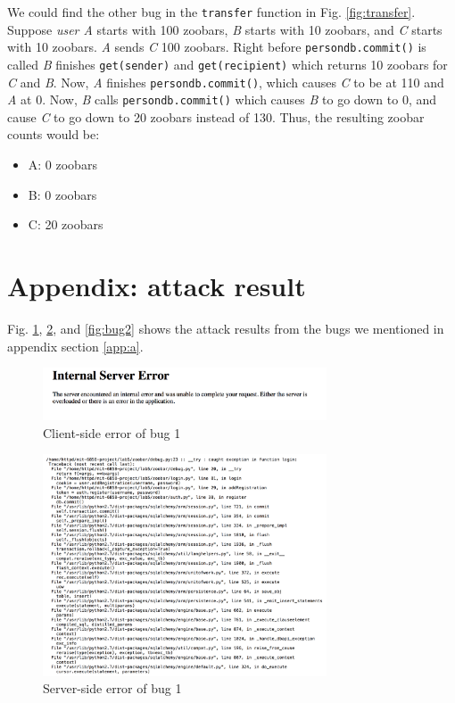 \documentclass{llncs}
\begin{document}
We could find the other bug in the \texttt{transfer} function in
Fig. \ref{fig:transfer}. Suppose \textit{user A} starts with 100
zoobars, \textit{B} starts with 10 zoobars, and \textit{C} starts with
10 zoobars. \textit{A} sends \textit{C} 100 zoobars. Right before
\texttt{persondb.commit()} is called \textit{B} finishes
\texttt{get(sender)} and \texttt{get(recipient)} which returns 10
zoobars for \textit{C} and \textit{B}. Now, \textit{A} finishes
\texttt{persondb.commit()}, which causes \textit{C} to be at 110 and
\textit{A} at 0. Now, \textit{B} calls \texttt{persondb.commit()}
which causes \textit{B} to go down to 0, and cause \textit{C} to go
down to 20 zoobars instead of 130. Thus, the resulting zoobar counts
would be:
\begin{itemize}
\item A: 0 zoobars
\item B: 0 zoobars
\item C: 20 zoobars
\end{itemize}

\section{Appendix: attack result}
\label{app:b}

Fig. \ref{fig:bug1c}, \ref{fig:bug1s}, and \ref{fig:bug2} shows the
attack results from the bugs we mentioned in appendix section
\ref{app:a}.

\begin{figure}
  \begin{center}
    \includegraphics[width=0.75\textwidth]{bug1c.png}
  \end{center}
  \caption{Client-side error of bug 1}
  \label{fig:bug1c}
\end{figure}

\begin{figure}
  \begin{center}
    \includegraphics[width=0.75\textwidth]{bug1s.png}
  \end{center}
  \caption{Server-side error of bug 1}
  \label{fig:bug1s}
\end{figure}
\end{document}

